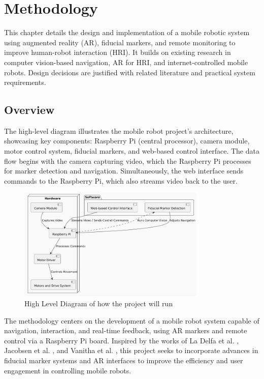 \chapter{\label{ch:methodology} Methodology}
This chapter details the design and implementation of a mobile robotic system using augmented reality (AR), fiducial markers, and remote monitoring to improve human-robot interaction (HRI). It builds on existing research in computer vision-based navigation, AR for HRI, and internet-controlled mobile robots. Design decisions are justified with related literature and practical system requirements.

\section{\label{sec:overview} Overview}
The high-level diagram illustrates the mobile robot project's architecture, showcasing key components: Raspberry Pi (central processor), camera module, motor control system, fiducial markers, and web-based control interface. The data flow begins with the camera capturing video, which the Raspberry Pi processes for marker detection and navigation. Simultaneously, the web interface sends commands to the Raspberry Pi, which also streams video back to the user.

\begin{figure}[H]
	\centering
	\includegraphics[width=0.8\textwidth]{ch3/figs/diagram.png}
	\caption{High Level Diagram of how the project will run}
	\label{fig:high_level_diagram}
\end{figure}

The methodology centers on the development of a mobile robot system capable of navigation, interaction, and real-time feedback, using AR markers and remote control via a Raspberry Pi board. Inspired by the works of La Delfa et al. \cite{delfa2015}, Jacobsen et al. \cite{jacobsen2018}, and Vanitha et al. \cite{vanitha2016}, this project seeks to incorporate advances in fiducial marker systems and AR interfaces to improve the efficiency and user engagement in controlling mobile robots.

